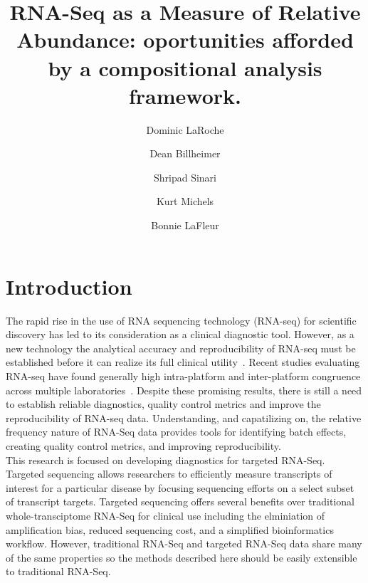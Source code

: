 \documentclass{article}\usepackage[]{graphicx}\usepackage[]{color}
\title{RNA-Seq as a Measure of Relative Abundance: oportunities afforded by a compositional analysis framework.}
\author{Dominic LaRoche \and Dean Billheimer \and Shripad Sinari \and Kurt Michels \and  Bonnie LaFleur}
\theoremstyle{definition}
\begin{document}
\maketitle

\doublespacing


\section{Introduction}

The rapid rise in the use of RNA sequencing technology (RNA-seq) for scientific discovery has led to its consideration as a clinical diagnostic tool.  However, as a new technology the analytical accuracy and reproducibility of RNA-seq must be established before it can realize its full clinical utility~\cite{SEQC/MAQC-IIIConsortium2014,VanKeuren-Jensen2014}. Recent studies evaluating RNA-seq have found generally high intra-platform and inter-platform congruence across multiple laboratories~\cite{Li2013, tHoen2013, SEQC/MAQC-IIIConsortium2014}.  Despite these promising results, there is still a need to establish reliable diagnostics, quality control metrics and improve the reproducibility of RNA-seq data.  Understanding, and capatilizing on, the relative frequency nature of RNA-Seq data provides tools for identifying batch effects, creating quality control metrics, and improving reproducibility.\\

This research is focused on developing diagnostics for targeted RNA-Seq.  Targeted sequencing allows researchers to efficiently measure transcripts of interest for a particular disease by focusing sequencing efforts on a select subset of transcript targets.  Targeted sequencing offers several benefits over traditional whole-transciptome RNA-Seq for clinical use including the elminiation of amplification bias, reduced sequencing cost, and a simplified bioinformatics workflow.  However, traditional RNA-Seq and targeted RNA-Seq data share many of the same properties so the methods described here should be easily extensible to traditional RNA-Seq.\\

\end{document}
